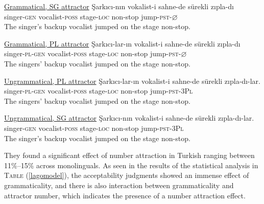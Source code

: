 \documentclass[11pt,a4paper]{article}
\begin{document}
\begin{exe}
\ex
\begin{xlist}
\ex \underline{Grammatical, SG attractor} \label{lago1}
\gll \c{S}ark{\i}c{\i}-n{\i}n vokalist-i sahne-de s\"{u}rekli z{\i}pla-d{\i}\\
singer-\textsc{gen} vocalist-\textsc{poss} stage-\textsc{loc} non-stop jump-\textsc{pst}-$\varnothing$\\
\glt The singer's backup vocalist jumped on the stage non-stop.

\ex \underline{Grammatical, PL attractor} \label{lago2}
\gll \c{S}ark{\i}c{\i}-lar-{\i}n vokalist-i sahne-de s\"{u}rekli z{\i}pla-d{\i}\\
singer-\textsc{pl}-\textsc{gen} vocalist-\textsc{poss} stage-\textsc{loc} non-stop jump-\textsc{pst}-$\varnothing$\\
\glt The singers' backup vocalist jumped on the stage non-stop.

\ex \underline{Ungrammatical, PL attractor} \label{lago3}
\gll \c{S}ark{\i}c{\i}-lar-{\i}n vokalist-i sahne-de s\"{u}rekli z{\i}pla-d{\i}-lar.\\
singer-\textsc{pl}-\textsc{gen} vocalist-\textsc{poss} stage-\textsc{loc} non-stop jump-\textsc{pst}-\textsc{3Pl}\\
\glt The singers' backup vocalist jumped on the stage non-stop.

\ex \underline{Ungrammatical, SG attractor} \label{lago4}
\gll \c{S}ark{\i}c{\i}-n{\i}n vokalist-i sahne-de s\"{u}rekli z{\i}pla-d{\i}-lar.\\
singer-\textsc{gen} vocalist-\textsc{poss} stage-\textsc{loc} non-stop jump-\textsc{pst}-\textsc{3Pl}\\
\glt The singer's backup vocalist jumped on the stage non-stop.
\end{xlist}
\end{exe}

They found a significant effect of number attraction in Turkish ranging
between 11\%--15\% across monolinguals. As seen in the results of the
statistical analysis in \textsc{Table} (\ref{lagomodel}), the
acceptability judgments showed an immense effect of grammaticality, and
there is also interaction between grammaticality and attractor number,
which indicates the presence of a number attraction effect.
\end{document}
